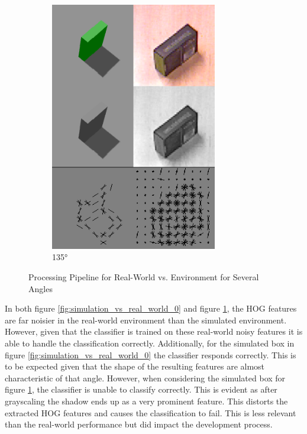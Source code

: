 \documentclass[letterpaper, 10 pt, conference]{conf/ieeeconf}  %
\begin{document}
\begin{figure}[H]
\begin{subfigure}[b]{0.238\textwidth}
    \includegraphics[width=0.8\textwidth]{simulation_vs_real_world_broken.png}
    \caption{\label{fig:simulation_vs_real_world_135}\ang{135}}
  \end{subfigure}
  \caption{\label{fig:pipelines} Processing Pipeline for Real-World vs.
    Environment for Several Angles}
\end{figure}

In both figure \ref{fig:simulation_vs_real_world_0} and figure
\ref{fig:simulation_vs_real_world_135}, the HOG features are far noisier in the
real-world environment than the simulated environment. However, given that the
classifier is trained on these real-world noisy features it is able to handle
the classification correctly. Additionally, for the simulated box in figure
\ref{fig:simulation_vs_real_world_0} the classifier responds correctly. This is
to be expected given that the shape of the resulting features are almost
characteristic of that angle. However, when considering the simulated box for
figure \ref{fig:simulation_vs_real_world_135}, the classifier is unable to
classify correctly. This is evident as after grayscaling the shadow ends up as a
very prominent feature. This distorts the extracted HOG features and causes the
classification to fail. This is less relevant than the real-world performance
but did impact the development process.
\end{document}
